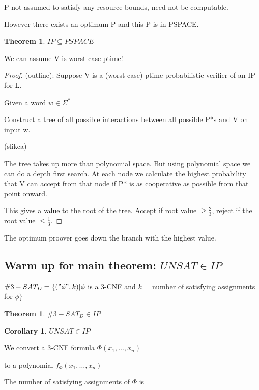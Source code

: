 \documentclass[a4paper,12pt]{article}
\theoremstyle{definition}
\newtheorem{theorem}[counter]{Theorem}
\newtheorem{corollary}[counter]{Corollary}
\theoremstyle{remark}
\begin{document}
P not assumed to satisfy any resource bounds, need not be computable.

However there exists an optimum P and this P is in PSPACE.

\begin{theorem}
    $IP \subseteq PSPACE$
\end{theorem}

We can assume V is worst case ptime!

\begin{proof}
    (outline):
    Suppose V is a (worst-case) ptime probabilistic verifier of an IP for L.

    Given a word $w \in \Sigma^*$

    Construct a tree of all possible interactions between all possible P*s and V on input w.

    (slikca)

    The tree takes up more than polynomial space. But using polynomial space we can do a depth first search. At each node we calculate
    the highest probability that V can accept from that node if P* is as cooperative as possible from that point onward.

    This gives a value to the root of the tree. Accept if root value $\geq \frac{2}{3}$, reject if the root value $\leq \frac{1}{3}$.
\end{proof}

The optimum proover goes down the branch with the highest value.

\subsection*{Warm up for main theorem: $UNSAT \in IP$}
$\#3-SAT_D = \{("\phi", k) | \phi$ is a 3-CNF and $k$ = number of satisfying assignments for $\phi\}$

\begin{theorem}
    $\#3-SAT_D \in IP$
\end{theorem}

\begin{corollary}
    $UNSAT \in IP$
\end{corollary}

We convert a 3-CNF formula $\Phi (x_1, \dots, x_n)$


to a polynomial $f_{\Phi} (x_1, \dots, x_n)$

The number of satisfying assignments of $\Phi$ is
\end{document}
